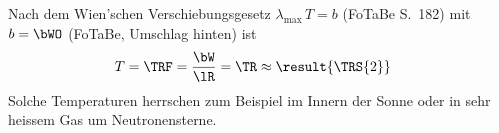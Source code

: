Nach dem Wien'schen Verschiebungsgesetz $\lambda_\text{max}\,T = b$ (FoTaBe S.~182) mit $b = \bWO$ (FoTaBe, Umschlag hinten) ist
\begin{align}
 T &= \TRF = \frac{\bW}{\lR} = \TR \approx \result{\TRS{2}}
\end{align}
Solche Temperaturen herrschen zum Beispiel im Innern der Sonne oder in sehr heissem Gas um Neutronensterne.
